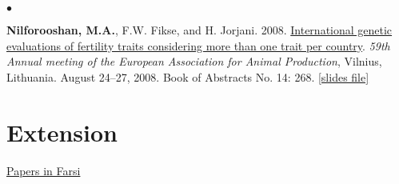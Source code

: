\documentclass[margin,line]{res}
\newenvironment{list2}{
  \begin{list}{$\bullet$}{%
      \setlength{\itemsep}{0in}
      \setlength{\parsep}{0in} \setlength{\parskip}{0in}
      \setlength{\topsep}{0in} \setlength{\partopsep}{0in}
      \setlength{\leftmargin}{0.2in}}}{\end{list}}
\begin{document}
\begin{resume}
\begin{list2}
\item {\bf Nilforooshan, M.A.}, F.W. Fikse, and H. Jorjani. 2008. \href{https://www.researchgate.net/publication/358219159_International_genetic_evaluations_of_fertility_traits_considering_more_than_one_trait_per_country}{International genetic evaluations of fertility traits considering more than one trait per country}. {\em 59th Annual meeting of the European Association for Animal Production}, Vilnius, Lithuania. August 24--27, 2008. Book of Abstracts No. 14: 268. \href{https://drive.google.com/file/d/0B2l_izQwJmVpd2pieXNtWTQxMkE/view?usp=sharing&resourcekey=0-Q2h6mMWM8Aw-Tsi787os4g}{[slides file]}
\end{list2}
\section{\sc Extension}

\href{https://nilforooshan.github.io/resume/extension}{Papers in Farsi}

\end{resume}
\end{document}
